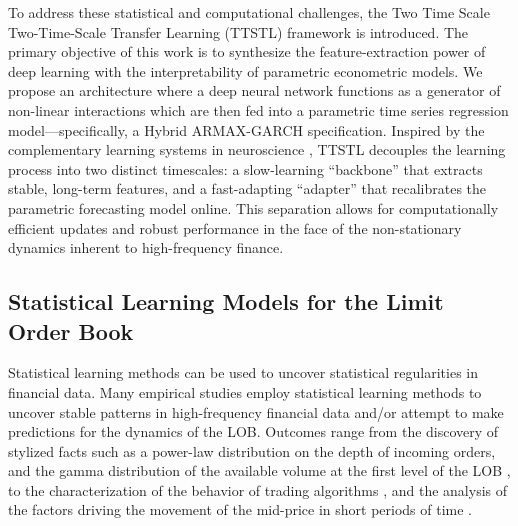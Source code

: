 \documentclass[10pt,a4paper,oneside]{article}
\providecommand{\DIFaddtex}[1]{{\protect\color{blue} \sf #1}} %
\providecommand{\DIFdeltex}[1]{{\protect\color{red} \scriptsize #1}} %
\providecommand{\DIFaddbegin}{} %
\providecommand{\DIFaddend}{} %
\providecommand{\DIFdelbegin}{} %
\providecommand{\DIFdelend}{} %
\providecommand{\DIFadd}[1]{\texorpdfstring{\DIFaddtex{#1}}{#1}} %
\providecommand{\DIFdel}[1]{\texorpdfstring{\DIFdeltex{#1}}{}} %
\newcommand{\DIFscaledelfig}{0.5}
\newlength{\DIFdelgraphicswidth} %
\newlength{\DIFdelgraphicsheight} %
\newcommand{\DIFaddincludegraphics}[2][]{{\color{blue}\fbox{\DIFOincludegraphics[#1]{#2}}}} %
\newcommand{\DIFdelincludegraphics}[2][]{%
\sbox{\DIFdelgraphicsbox}{\DIFOincludegraphics[#1]{#2}}%
\settoboxwidth{\DIFdelgraphicswidth}{\DIFdelgraphicsbox} %
\settoboxtotalheight{\DIFdelgraphicsheight}{\DIFdelgraphicsbox} %
\scalebox{\DIFscaledelfig}{%
\parbox[b]{\DIFdelgraphicswidth}{\usebox{\DIFdelgraphicsbox}\\[-\baselineskip] \rule{\DIFdelgraphicswidth}{0em}}\llap{\resizebox{\DIFdelgraphicswidth}{\DIFdelgraphicsheight}{%
\setlength{\unitlength}{\DIFdelgraphicswidth}%
\begin{picture}(1,1)%
\thicklines\linethickness{2pt} %
{\color[rgb]{1,0,0}\put(0,0){\framebox(1,1){}}}%
{\color[rgb]{1,0,0}\put(0,0){\line( 1,1){1}}}%
{\color[rgb]{1,0,0}\put(0,1){\line(1,-1){1}}}%
\end{picture}%
}\hspace*{3pt}}} %
} %
\DeclareRobustCommand{\DIFaddbegin}{\DIFOaddbegin \let\includegraphics\DIFaddincludegraphics} %
\DeclareRobustCommand{\DIFaddend}{\DIFOaddend \let\includegraphics\DIFOincludegraphics} %
\DeclareRobustCommand{\DIFdelbegin}{\DIFOdelbegin \let\includegraphics\DIFdelincludegraphics} %
\DeclareRobustCommand{\DIFdelend}{\DIFOaddend \let\includegraphics\DIFOincludegraphics} %
\begin{document}
To address these statistical and computational challenges, the \DIFdelbegin \DIFdel{Two Time Scale }\DIFdelend \DIFaddbegin \DIFadd{Two-Time-Scale }\DIFaddend Transfer Learning (TTSTL) framework is introduced. The primary objective of this work is to synthesize the feature-extraction power of deep learning with the interpretability of parametric econometric models. We propose an architecture where a deep neural network functions as a generator of non-linear interactions which are then fed into a parametric time series regression model—specifically, a Hybrid ARMAX-GARCH specification. Inspired by the complementary learning systems in neuroscience \cite{pham_continual_2024}, TTSTL decouples the learning process into two distinct timescales: a slow-learning ``backbone'' that extracts stable, long-term features, and a fast-adapting ``adapter'' that recalibrates the parametric forecasting model online. This separation allows for computationally efficient updates and robust performance in the face of the non-stationary dynamics inherent to high-frequency finance.

\subsection{Statistical Learning Models for the Limit Order Book}
\label{SubSect:LM}
Statistical learning methods \cite{hastie2017elements} can be used to uncover statistical regularities in financial data. Many empirical studies employ statistical learning methods to uncover stable patterns in high-frequency financial data and/or attempt to make predictions for the dynamics of the LOB. Outcomes range from the discovery of stylized facts such as a power-law distribution on the depth of incoming orders, and the gamma distribution of the available volume at the first level of the LOB \cite{Bouchaud_2002}, to the characterization of the behavior of trading algorithms \cite{cartea2023statistical}, and the analysis of the factors driving the movement of the mid-price in short periods of time \cite{cont2013price, cont2023cross, CENESIZOGLU202277}.
\end{document}
